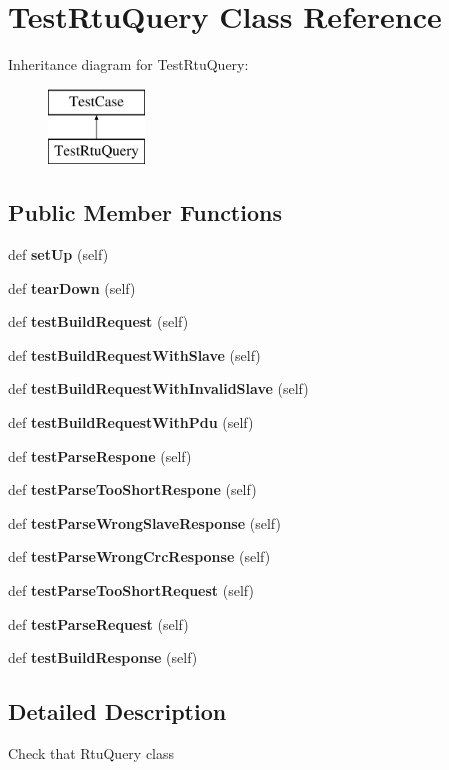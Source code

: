 \section{Test\+Rtu\+Query Class Reference}
\label{classtests_1_1unittest__modbus__rtu_1_1_test_rtu_query}
Inheritance diagram for Test\+Rtu\+Query\+:\begin{figure}[H]
\begin{center}
\leavevmode
\includegraphics[height=2.000000cm]{classtests_1_1unittest__modbus__rtu_1_1_test_rtu_query}
\end{center}
\end{figure}
\subsection*{Public Member Functions}
\begin{DoxyCompactItemize}
\item 
def {\bf set\+Up} (self)
\item 
def {\bf tear\+Down} (self)
\item 
def {\bf test\+Build\+Request} (self)
\item 
def {\bf test\+Build\+Request\+With\+Slave} (self)
\item 
def {\bf test\+Build\+Request\+With\+Invalid\+Slave} (self)
\item 
def {\bf test\+Build\+Request\+With\+Pdu} (self)
\item 
def {\bf test\+Parse\+Respone} (self)
\item 
def {\bf test\+Parse\+Too\+Short\+Respone} (self)
\item 
def {\bf test\+Parse\+Wrong\+Slave\+Response} (self)
\item 
def {\bf test\+Parse\+Wrong\+Crc\+Response} (self)
\item 
def {\bf test\+Parse\+Too\+Short\+Request} (self)
\item 
def {\bf test\+Parse\+Request} (self)
\item 
def {\bf test\+Build\+Response} (self)
\end{DoxyCompactItemize}


\subsection{Detailed Description}
\begin{DoxyVerb}Check that RtuQuery class\end{DoxyVerb}
 

